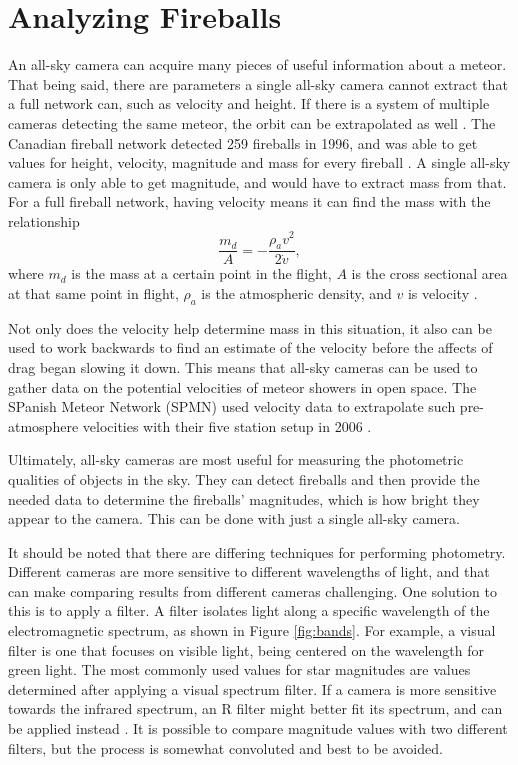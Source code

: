 \section{Analyzing Fireballs}

An all-sky camera can acquire many pieces of useful information about a meteor. That being said, there are parameters a single all-sky camera cannot extract that a full network can, such as velocity and height. If there is a system of multiple cameras detecting the same meteor, the orbit can be extrapolated as well \cite{Trigo-Rodriguez2009}. The Canadian fireball network detected 259 fireballs in 1996, and was able to get values for height, velocity, magnitude and mass for every fireball \cite{Halliday1996}. A single all-sky camera is only able to get magnitude, and would have to extract mass from that. For a full fireball network, having velocity means it can find the mass with the relationship
\begin{equation} 
	\label{eq:mass}
	\frac{m_d}{A} = -\frac{\rho_a v^2}{2 \dot v},
\end{equation}
where $m_d$ is the mass at a certain point in the flight, $A$ is the cross sectional area at that same point in flight, $\rho_a$ is the atmospheric density, and $v$ is velocity \cite{Halliday1996}.


Not only does the velocity help determine mass in this situation, it also can be used to work backwards to find an estimate of the velocity before the affects of drag began slowing it down. This means that all-sky cameras can be used to gather data on the potential velocities of meteor showers in open space. The SPanish Meteor Network (SPMN) used velocity data to extrapolate such pre-atmosphere velocities with their five station setup in 2006 \cite{Trigo-Rodriguez2007}. 

Ultimately, all-sky cameras are most useful for measuring the photometric qualities of objects in the sky. They can detect fireballs and then provide the needed data to determine the fireballs' magnitudes, which is how bright they appear to the camera. This can be done with just a single all-sky camera.

It should be noted that there are differing techniques for performing photometry. Different cameras are more sensitive to different wavelengths of light, and that can make comparing results from different cameras challenging. One solution to this is to apply a filter. A filter isolates light along a specific wavelength of the electromagnetic spectrum, as shown in Figure \ref{fig:bands}. For example, a visual filter is one that focuses on visible light, being centered on the wavelength for green light. The most commonly used values for star magnitudes are values determined after applying a visual spectrum filter. If a camera is more sensitive towards the infrared spectrum, an R filter might better fit its spectrum, and can be applied instead \cite{Suggs2014}. It is possible to compare magnitude values with two different filters, but the process is somewhat convoluted and best to be avoided.

